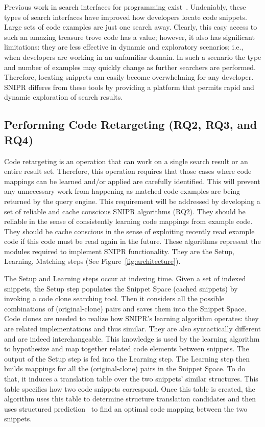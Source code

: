 \documentclass[conference]{IEEEtran}
\begin{document}
Previous work in search interfaces for programming exist~\cite{Brandt:2010tp, Bajracharya:2006vn, Sahavechaphan:2006tc, Bajracharya:2010um, Hummel:eq, LazzariniLemos:2007jh, Reiss:2009fu}. Undeniably, these types of search interfaces have improved how developers locate code snippets. Large sets of code examples are just one search away. Clearly, this easy access to such an amazing treasure trove code has a value; however, it also has significant limitations: they are less effective in dynamic and exploratory scenarios; i.e., when developers are working in an unfamiliar domain. In such a scenario the type and number of examples may quickly change as further searchers are performed. Therefore, locating snippets can easily become overwhelming for any developer. \uppercase{SnipR} differes from these tools by providing a platform that permits rapid and dynamic exploration of search results. 


\subsection{Performing Code Retargeting (RQ2, RQ3, and RQ4)}
\label{sec:restqs}

Code retargeting is an operation that can work on a single search result or an entire result set. Therefore, this operation requires that those cases where code mappings can be learned and/or applied are carefully identified. This will prevent any unnecessary work from happening as matched code examples are being returned by the query engine. This requirement will be addressed by developing a set of reliable and cache conscious \uppercase{SnipR} algorithms (RQ2). They should be reliable in the sense of consistently learning code mappings from example code. They should be cache conscious in the sense of exploiting recently read example code if this code must be read again in the future. These algorithms represent the modules required to implement SNIPR functionality. They are the Setup, Learning, Matching steps (See Figure~\ref{fig:architecture}).

The Setup and Learning steps occur at indexing time. Given a set of indexed snippets, the Setup step populates the Snippet Space (cached snippets) by invoking a code clone searching tool. Then it considers all the possible combinations of (original-clone) pairs and saves them into the Snippet Space. Code clones are needed to realize how \uppercase{SnipR}’s learning algorithm operates: they are related implementations and thus similar. They are also syntactically different and are indeed interchangeable. This knowledge is used by the learning algorithm to hypothesize and map together related code elements between snippets. The output of the Setup step is fed into the Learning step. The Learning step then builds mappings for all the (original-clone) pairs in the Snippet Space. To do that, it induces a translation table over the two snippets' similar structures. This table specifies how two code snippets correspond. Once this table is created, the algorithm uses this table to determine structure translation candidates and then uses structured prediction~\cite{Collins:2002uo} to find an optimal code mapping between the two snippets. 
\end{document}
